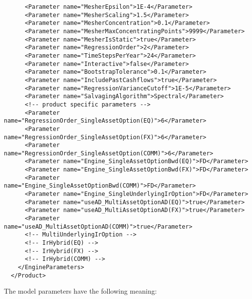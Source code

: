 \begin{verbatim}
      <Parameter name="MesherEpsilon">1E-4</Parameter>
      <Parameter name="MesherScaling">1.5</Parameter>
      <Parameter name="MesherConcentration">0.1</Parameter>
      <Parameter name="MesherMaxConcentratingPoints">9999</Parameter>
      <Parameter name="MesherIsStatic">true</Parameter>
      <Parameter name="RegressionOrder">2</Parameter>
      <Parameter name="TimeStepsPerYear">24</Parameter>
      <Parameter name="Interactive">false</Parameter>
      <Parameter name="BootstrapTolerance">0.1</Parameter>
      <Parameter name="IncludePastCashflows">true</Parameter>
      <Parameter name="RegressionVarianceCutoff">1E-5</Parameter>
      <Parameter name="SalvagingAlgorithm">Spectral</Parameter>
      <!-- product specific parameters -->
      <Parameter name="RegressionOrder_SingleAssetOption(EQ)">6</Parameter>
      <Parameter name="RegressionOrder_SingleAssetOption(FX)">6</Parameter>
      <Parameter name="RegressionOrder_SingleAssetOption(COMM)">6</Parameter>
      <Parameter name="Engine_SingleAssetOptionBwd(EQ)">FD</Parameter>
      <Parameter name="Engine_SingleAssetOptionBwd(FX)">FD</Parameter>
      <Parameter name="Engine_SingleAssetOptionBwd(COMM)">FD</Parameter>
      <Parameter name="Engine_SingleUnderlyingIrOption">FD</Parameter>
      <Parameter name="useAD_MultiAssetOptionAD(EQ)">true</Parameter>
      <Parameter name="useAD_MultiAssetOptionAD(FX)">true</Parameter>
      <Parameter name="useAD_MultiAssetOptionAD(COMM)">true</Parameter>
      <!-- MultiUnderlyingIrOption -->
      <!-- IrHybrid(EQ) -->
      <!-- IrHybrid(FX) -->
      <!-- IrHybrid(COMM) -->
    </EngineParameters>
  </Product>
\end{verbatim}

The model parameters have the following meaning:

